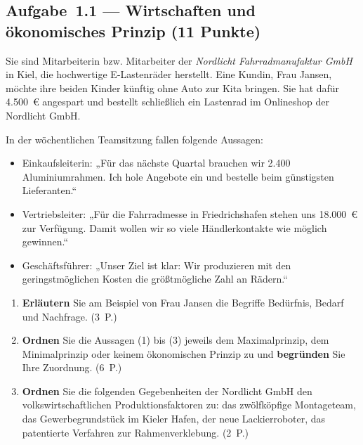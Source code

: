 
\subsection*{Aufgabe~1.1 --- Wirtschaften und ökonomisches Prinzip (11 Punkte)}

Sie sind Mitarbeiterin bzw. Mitarbeiter der \emph{Nordlicht Fahrradmanufaktur GmbH} in Kiel,
die hochwertige E-Lastenräder herstellt. Eine Kundin, Frau Jansen, möchte ihre beiden Kinder
künftig ohne Auto zur Kita bringen. Sie hat dafür 4.500~€ angespart und bestellt schließlich
ein Lastenrad im Onlineshop der Nordlicht GmbH.

In der wöchentlichen Teamsitzung fallen folgende Aussagen:
\begin{itemize}
  \item[(1)] Einkaufsleiterin: „Für das nächste Quartal brauchen wir 2.400 Aluminiumrahmen.
    Ich hole Angebote ein und bestelle beim günstigsten Lieferanten.``
  \item[(2)] Vertriebsleiter: „Für die Fahrradmesse in Friedrichshafen stehen uns
    18.000~€ zur Verfügung. Damit wollen wir so viele Händlerkontakte wie möglich gewinnen.``
  \item[(3)] Geschäftsführer: „Unser Ziel ist klar: Wir produzieren mit den geringstmöglichen
    Kosten die größtmögliche Zahl an Rädern.``
\end{itemize}

\begin{enumerate}[label=\alph*)]
  \item \textbf{Erläutern} Sie am Beispiel von Frau Jansen die Begriffe Bedürfnis, Bedarf
    und Nachfrage. \hfill (3~P.)
  \item \textbf{Ordnen} Sie die Aussagen (1) bis (3) jeweils dem Maximalprinzip, dem
    Minimalprinzip oder keinem ökonomischen Prinzip zu und \textbf{begründen} Sie Ihre
    Zuordnung. \hfill (6~P.)
  \item \textbf{Ordnen} Sie die folgenden Gegebenheiten der Nordlicht GmbH den
    volkswirtschaftlichen Produktionsfaktoren zu: das zwölfköpfige Montageteam, das
    Gewerbegrundstück im Kieler Hafen, der neue Lackierroboter, das patentierte Verfahren
    zur Rahmenverklebung. \hfill (2~P.)
\end{enumerate}

